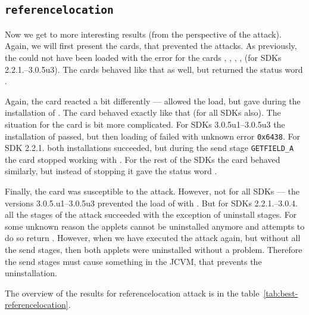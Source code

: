 

            \subsection{\texttt{referencelocation}}
            Now we get to more interesting results (from the perspective of the attack). Again, we will first present the cards, that prevented the attacks. As previously, the \vulnscap could not have been loaded with the error \shortswwrongdata for the cards \Dcard, \Fcard, \Gcard, \Hcard, \Inewcard (for SDKs 2.2.1.--3.0.5u3). The cards \Cnewcard behaved like that as well, but returned the status word \shortswunknown.
        
        Again, the card \Ccard reacted a bit differently --- allowed the load, but gave \shortswconditionsnotsatisfied during the installation of \vulnscap. The card \Icard behaved exactly like that (for all SDKs also).
        The situation for the card \Jcard is bit more complicated. For SDKs 3.0.5u1--3.0.5u3 the installation of \vulnscap passed, but then loading of \appletscap failed with unknown error \texttt{0x6438}. For SDK 2.2.1. both installations succeeded, but during the send stage \texttt{GETFIELD_A} the card stopped working with \scardenottransacted. For the rest of the SDKs the card behaved similarly, but instead of stopping it gave the status word \shortswinsnotsupported.

    Finally, the card \Acard was susceptible to the attack. However, not for all SDKs --- the versions 3.0.5.u1--3.0.5u3 prevented the load of \appletscap with \shortswwrongdata. But for SDKs 2.2.1.--3.0.4. all the stages of the attack succeeded with the exception of uninstall stages. For some unknown reason the applets cannot be uninstalled anymore and attempts to do so return \shortswconditionsnotsatisfied. However, when we have executed the attack again, but without all the send stages, then both applets were uninstalled without a problem. Therefore the send stages must cause something in the JCVM, that prevents the uninstallation.

    The overview of the results for referencelocation attack is in the table~\ref{tab:best-referencelocation}.


